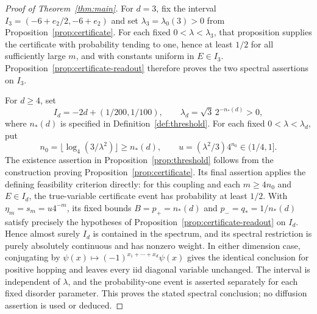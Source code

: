 \begin{proof}[Proof of Theorem~\ref{thm:main}]
For $d=3$, fix the interval $I_3=(-6+e_2/2,-6+e_2)$ and set
$\lambda_3=\lambda_0(3)>0$ from Proposition~\ref{prop:certificate}.
For each fixed $0<\lambda<\lambda_3$, that proposition supplies the
certificate with probability tending to one, hence at least $1/2$
for all sufficiently large $m$, and with constants uniform in
$E\in I_3$. Proposition~\ref{prop:certificate-readout} therefore proves
the two spectral assertions on $I_3$.

For $d\ge4$, set
\[
 I_d=-2d+(1/200,1/100),\qquad
 \lambda_d=\sqrt3\,2^{-n_*(d)}>0,
\]
where $n_*(d)$ is specified in Definition~\ref{def:threshold}.
For each fixed $0<\lambda<\lambda_d$, put
\[
 n_0=\lfloor\log_4(3/\lambda^2)\rfloor\ge n_*(d),
 \qquad u=(\lambda^2/3)4^{n_0}\in(1/4,1].
\]
The existence assertion in Proposition~\ref{prop:threshold} follows
from the construction proving Proposition~\ref{prop:certificate}.
Its final assertion applies the defining feasibility criterion
directly: for this coupling and each $m\ge4n_0$ and $E\in I_d$,
the true-variable certificate event has probability at least $1/2$.
With $\eta_m=s_m=u4^{-m}$, its fixed bounds
$B=p_+=n_*(d)$ and $p_-=q_*=1/n_*(d)$ satisfy precisely the
hypotheses of Proposition~\ref{prop:certificate-readout} on $I_d$.
Hence almost surely $I_d$ is contained in the spectrum, and its
spectral restriction is purely absolutely continuous and has nonzero
weight. In either dimension case, conjugating by
$\psi(x)\mapsto(-1)^{x_1+\cdots+x_d}\psi(x)$ gives
the identical conclusion for positive hopping and leaves every
iid diagonal variable unchanged.
The interval is independent of $\lambda$, and the probability-one
event is asserted separately for each fixed disorder parameter.
This proves the stated spectral conclusion; no diffusion
assertion is used or deduced.
\end{proof}
